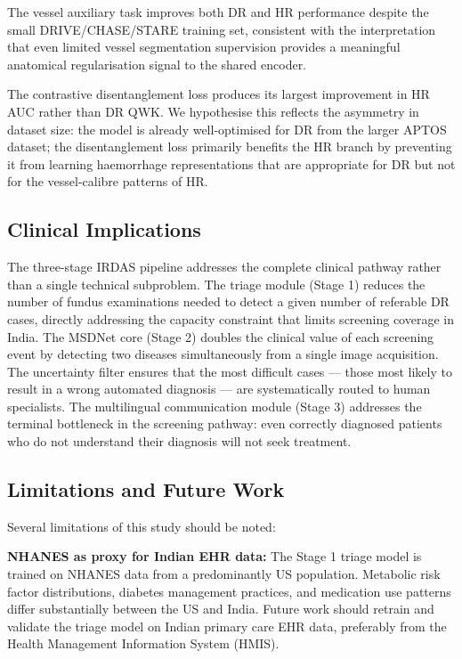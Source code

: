 \documentclass[review,12pt]{elsarticle}
\begin{document}
The vessel auxiliary task improves both DR and HR performance despite the
small DRIVE/CHASE/STARE training set, consistent with the interpretation that
even limited vessel segmentation supervision provides a meaningful anatomical
regularisation signal to the shared encoder.

The contrastive disentanglement loss produces its largest improvement in HR
AUC rather than DR QWK. We hypothesise this reflects the asymmetry in
dataset size: the model is already well-optimised for DR from the larger
APTOS dataset; the disentanglement loss primarily benefits the HR branch
by preventing it from learning haemorrhage representations that are
appropriate for DR but not for the vessel-calibre patterns of HR.

\subsection{Clinical Implications}

The three-stage IRDAS pipeline addresses the complete clinical pathway rather
than a single technical subproblem. The triage module (Stage 1) reduces the
number of fundus examinations needed to detect a given number of referable DR
cases, directly addressing the capacity constraint that limits screening
coverage in India. The MSDNet core (Stage 2) doubles the clinical value of
each screening event by detecting two diseases simultaneously from a single
image acquisition. The uncertainty filter ensures that the most difficult
cases — those most likely to result in a wrong automated diagnosis — are
systematically routed to human specialists. The multilingual communication
module (Stage 3) addresses the terminal bottleneck in the screening pathway:
even correctly diagnosed patients who do not understand their diagnosis will
not seek treatment.

\subsection{Limitations and Future Work}

Several limitations of this study should be noted:

\textbf{NHANES as proxy for Indian EHR data:} The Stage 1 triage model is
trained on NHANES data from a predominantly US population. Metabolic risk
factor distributions, diabetes management practices, and medication use
patterns differ substantially between the US and India. Future work should
retrain and validate the triage model on Indian primary care EHR data,
preferably from the Health Management Information System (HMIS).
\end{document}
